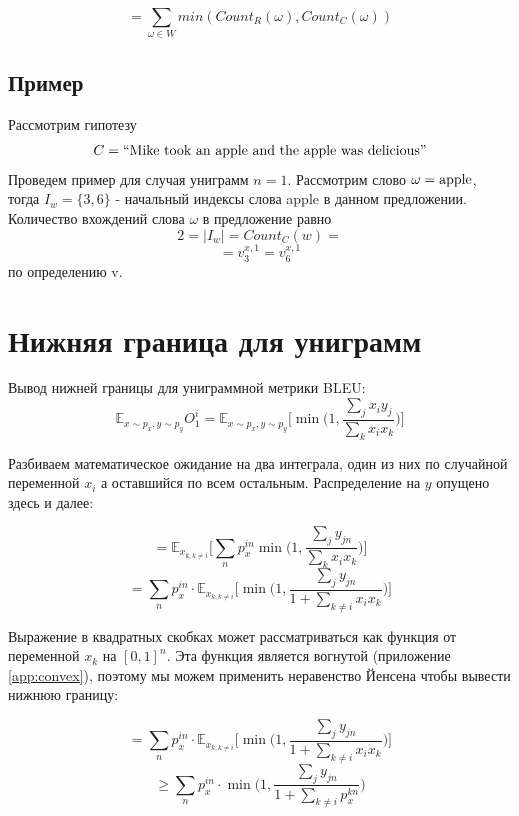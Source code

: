 \documentclass[14pt, a4paper]{extarticle}
\begin{document}
  $$
  =\sum\limits_{\omega \in W} min(Count_R(\omega), Count_C(\omega))
$$
\subsection{Пример}
Рассмотрим гипотезу
$$ C = \textnormal{“Mike took an apple and the apple was delicious”}$$
Проведем пример для случая униграмм $n=1$.
Рассмотрим слово $\omega=\textnormal{apple}$, тогда $I_w = \{3, 6\}$ - начальный индексы слова apple в данном предложении.
Количество вхождений слова $\omega$ в предложение равно $$2 = |I_w| = Count_C(w)=$$  $$=v_3^{x, 1} = v_6^{x, 1}$$ по определению v.


\section{Нижняя граница для униграмм}
\label{app:unigramLB}
Вывод нижней границы для униграммной метрики BLEU:
\begin{equation}
\mathbb{E}_{x\sim p_x,y \sim p_y} O_1^i = \mathbb{E}_{x\sim p_x,y \sim p_y} \Big \lbrack \min \big(1, \frac{\sum_j x_i y_j}{\sum_k x_i x_k}\big) \Big \rbrack
\label{bleu_i_1}
\end{equation}

Разбиваем математическое ожидание на два интеграла, один из них по случайной переменной $x_i$ а оставшийся по всем остальным. Распределение на  $y$ опущено здесь и далее:

$$
= \mathbb{E}_{x_{k,k\neq i}} \Big \lbrack \sum_n p_x^{in} \min \big(1, \frac{\sum_j y_{jn}}{\sum_k x_i x_k}\big) \Big \rbrack
$$
\begin{equation}
= \sum_n p_x^{in} \cdot \mathbb{E}_{x_{k,k\neq i}} \Big \lbrack \min \big(1, \frac{\sum_j y_{jn}}{1+\sum_{k\neq i} x_i x_k}\big) \Big \rbrack
\label{bleu_i_2}
\end{equation}

Выражение в квадратных скобках может рассматриваться как функция от переменной $x_k$ на $[0,1]^n$. Эта функция является вогнутой (приложение \ref{app:convex}), поэтому мы можем применить неравенство Йенсена чтобы вывести нижнюю границу:


$$
= \sum_n p_x^{in} \cdot \mathbb{E}_{x_{k,k\neq i}} \Big \lbrack \min \big(1, \frac{\sum_j y_{jn}}{1+\sum_{k\neq i} x_i x_k}\big) \Big \rbrack
$$
\begin{equation}
\geq \sum_n p_x^{in} \cdot \min \big(1, \frac{\sum_j y_{jn}}{1+\sum_{k\neq i} p_x^{kn}}\big)
\label{bleu_i_3}
\end{equation}
\end{document}
